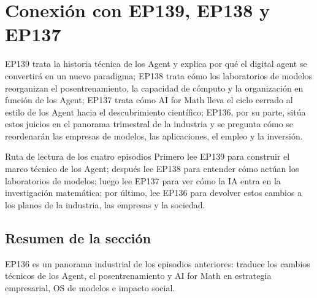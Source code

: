 \section{Conexión con EP139, EP138 y EP137}

EP139 trata la historia técnica de los Agent y explica por qué el digital agent se convertirá en un nuevo paradigma; EP138 trata cómo los laboratorios de modelos reorganizan el posentrenamiento, la capacidad de cómputo y la organización en función de los Agent; EP137 trata cómo AI for Math lleva el ciclo cerrado al estilo de los Agent hacia el descubrimiento científico; EP136, por su parte, sitúa estos juicios en el panorama trimestral de la industria y se pregunta cómo se reordenarán las empresas de modelos, las aplicaciones, el empleo y la inversión.

\begin{knowledgebox}{Ruta de lectura de los cuatro episodios}
Primero lee EP139 para construir el marco técnico de los Agent; después lee EP138 para entender cómo actúan los laboratorios de modelos; luego lee EP137 para ver cómo la IA entra en la investigación matemática; por último, lee EP136 para devolver estos cambios a los planos de la industria, las empresas y la sociedad.
\end{knowledgebox}

\subsection{Resumen de la sección}

EP136 es un panorama industrial de los episodios anteriores: traduce los cambios técnicos de los Agent, el posentrenamiento y AI for Math en estrategia empresarial, OS de modelos e impacto social.

